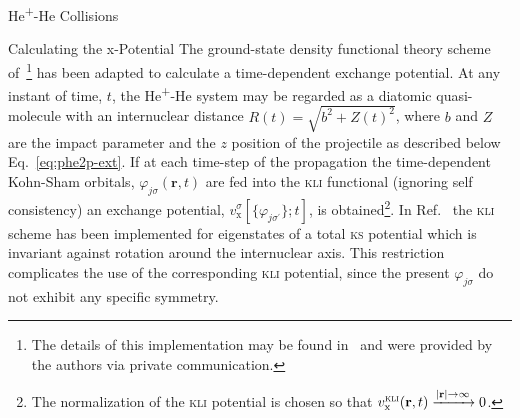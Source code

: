 \documentclass[letterpaper, 11 pt]{report}
\begin{document}
\begin{chapter}{\texorpdfstring{He\textsuperscript{+}}{He+}-He Collisions \label{chap:hephe}}
\begin{section}{Calculating the x-Potential \label{sec:pot}}
      The ground-state density functional theory scheme of~\cite{diamol}\footnote{The details of this
      implementation may be found in~\cite{diamol} and were provided by the authors via private
      communication.} has been adapted to calculate a time-dependent exchange potential. At any instant
      of time, $t$, the He\textsuperscript{+}-He system may be regarded as a diatomic quasi-molecule with
      an internuclear distance $R(t) = \sqrt{b^2 + Z(t)^2}$, where $b$ and $Z$ are the impact parameter
      and the $z$ position of the projectile as described below Eq.~\eqref{eq:phe2p-ext}. If at each
      time-step of the propagation the time-dependent Kohn-Sham orbitals,
      $\varphi_{j \sigma}(\mathbf{r},t)$ are fed into the \textsc{kli} functional (ignoring self
      consistency) an exchange potential, $v^{\sigma}_\mathrm{x}[ \{ \varphi_{j \sigma^\prime} \};t]$,
      is obtained\footnote{The normalization of the \textsc{kli} potential is chosen so that
      $v_\mathrm{x}^\textsc{kli}(\mathbf{r},t) \xrightarrow{\vert \mathbf{r} \vert \to \infty} 0$.}. In
      Ref.~\cite{diamol} the \textsc{kli} scheme has been implemented for eigenstates of a total
      \textsc{ks} potential which is invariant against rotation around the internuclear axis. This
      restriction complicates the use of the corresponding \textsc{kli} potential, since the present
      $\varphi_{j \sigma}$ do not exhibit any specific symmetry.


\end{section}
\end{chapter}
\end{document}
